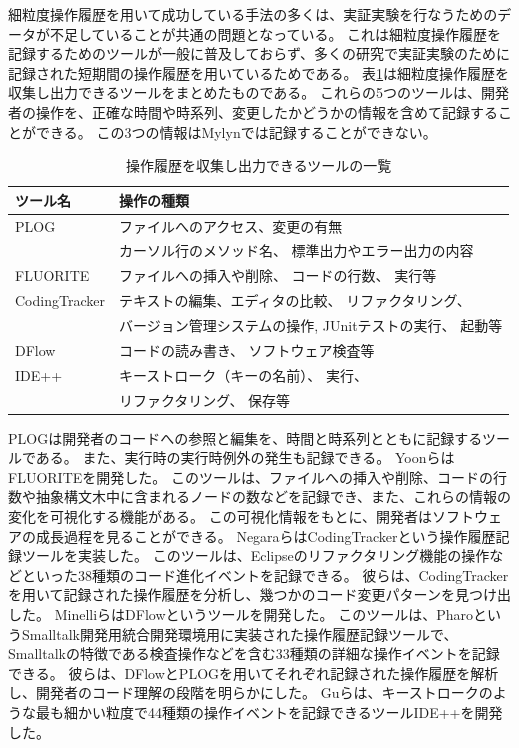 \documentclass[a4paper]{jsbook}
\begin{document}
細粒度操作履歴を用いて成功している手法の多くは、実証実験を行なうためのデータが不足していることが共通の問題となっている。
これは細粒度操作履歴を記録するためのツールが一般に普及しておらず、多くの研究で実証実験のために記録された短期間の操作履歴を用いているためである。
表\ref{finegrained}は細粒度操作履歴を収集し出力できるツールをまとめたものである。
これらの5つのツールは、開発者の操作を、正確な時間や時系列、変更したかどうかの情報を含めて記録することができる。
この3つの情報はMylynでは記録することができない。

\begin{table}[bt]
  \caption{操作履歴を収集し出力できるツールの一覧}
  \centering
  \begin{tabular}{ll}
    \hline
    ツール名& 操作の種類\\
    \hline
    PLOG\cite{plog} & ファイルへのアクセス、変更の有無\\
           & カーソル行のメソッド名、 標準出力やエラー出力の内容 \\
    FLUORITE\cite{yoon:2011} & ファイルへの挿入や削除、
          コードの行数、 実行等  \\
    CodingTracker & 
    テキストの編集、エディタの比較、 リファクタリング、\\
    \cite{Negara:2012}\cite{Negara:2014}  & 
    バージョン管理システムの操作, 
    JUnitテストの実行、 起動等\\
    {\sc DFlow}\cite{minelli:2014} & コードの読み書き、 ソフトウェア検査等\\
    IDE++\cite{Gu:2014} & キーストローク（キーの名前）、 実行、 \\
                        & リファクタリング、 保存等\\
    \hline
  \end{tabular}
\label{finegrained}
\end{table}

PLOG\cite{plog}は開発者のコードへの参照と編集を、時間と時系列とともに記録するツールである。
また、実行時の実行時例外の発生も記録できる。
YoonらはFLUORITE\cite{yoon:2011}を開発した。
このツールは、ファイルへの挿入や削除、コードの行数や抽象構文木中に含まれるノードの数などを記録でき、また、これらの情報の変化を可視化する機能がある。
この可視化情報をもとに、開発者はソフトウェアの成長過程を見ることができる。
NegaraらはCodingTracker\cite{Negara:2012}という操作履歴記録ツールを実装した。
このツールは、Eclipseのリファクタリング機能の操作などといった38種類のコード進化イベントを記録できる。
彼らは、CodingTrackerを用いて記録された操作履歴を分析し、幾つかのコード変更パターンを見つけ出した\cite{Negara:2014}。
Minelliらは{\sc DFlow}というツールを開発した。
このツールは、PharoというSmalltalk開発用統合開発環境用に実装された操作履歴記録ツールで、Smalltalkの特徴である検査操作などを含む33種類の詳細な操作イベントを記録できる。
彼らは、{\sc DFlow}とPLOGを用いてそれぞれ記録された操作履歴を解析し、開発者のコード理解の段階を明らかにした。
Guらは、キーストロークのような最も細かい粒度で44種類の操作イベントを記録できるツールIDE++\cite{Gu:2014}を開発した。
\end{document}
